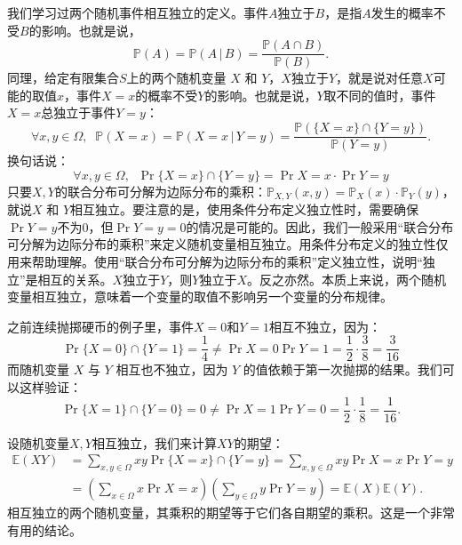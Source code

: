 \documentclass[12pt,UTF8]{ctexbook}
\begin{document}
我们学习过两个随机事件相互独立的定义。事件$A$独立于$B$，是指$A$发生的概率不受$B$的影响。也就是说，
$$\mathbb{P}(A) = \mathbb{P}(A \, | \, B) = \frac{\mathbb{P}(A \cap B)}{\mathbb{P}(B)}.$$
同理，给定有限集合$S$上的两个随机变量 \(X\) 和 \(Y\)，$X$独立于$Y$，就是说对任意$X$可能的取值$x$，事件$X=x$的概率不受$Y$的影响。也就是说，$Y$取不同的值时，事件$X=x$总独立于事件$Y=y$：
$$
\forall x,y \in \Omega,\;\;\mathbb{P}(X = x) = \mathbb{P}(X = x \, | \, Y = y) = \frac{\mathbb{P}(\{X = x\} \cap \{Y = y\})}{\mathbb{P}(Y = y)}.$$
换句话说：
\[
\forall x,y \in \Omega,\;\;
\Pr{\{X = x\}\cap\{Y = y\}} = \Pr{X = x} \cdot \Pr{Y = y}
\]
只要$X,Y$的联合分布可分解为边际分布的乘积：\(\mathbb{P}_{X,Y}(x,y) = \mathbb{P}_X(x) \cdot \mathbb{P}_Y(y)\)，就说\(X\) 和 \(Y\)相互独立。要注意的是，使用条件分布定义独立性时，需要确保$\Pr{Y=y}$不为$0$，但$\Pr{Y=y} = 0$的情况是可能的。因此，我们一般采用“联合分布可分解为边际分布的乘积”来定义随机变量相互独立。用条件分布定义的独立性仅用来帮助理解。使用“联合分布可分解为边际分布的乘积”定义独立性，说明“独立”是相互的关系。$X$独立于$Y$，则$Y$独立于$X$。反之亦然。本质上来说，两个随机变量相互独立，意味着一个变量的取值不影响另一个变量的分布规律。

\begin{ex}
之前连续抛掷硬币的例子里，事件$X=0$和$Y=1$相互不独立，因为：
\[
\Pr{\{X=0\}\cap\{Y=1\}} = \frac{1}{4} \neq \Pr{X=0}\Pr{Y=1} = \frac{1}{2} \cdot \frac{3}{8} = \frac{3}{16}
\]
而随机变量 \(X\) 与 \(Y\) 相互也不独立，因为 \(Y\) 的值依赖于第一次抛掷的结果。我们可以这样验证：
\[
\Pr{\{X=1\}\cap\{Y=0\}} = 0 \neq \Pr{X=1}\Pr{Y=0} = \frac{1}{2} \cdot \frac{1}{8} = \frac{1}{16}.
\]
\end{ex}

设随机变量$X,Y$相互独立，我们来计算$XY$的期望：
\begin{align*}
\mathbb{E}(XY) &= \sum_{x,y\in \Omega} xy \Pr{\{X=x\}\cap\{Y=y\}} = \sum_{x,y\in \Omega} xy \Pr{X=x} \Pr{Y=y} \\
&= \left(\sum_{x\in \Omega} x \Pr{X=x}\right) \left(\sum_{y\in \Omega} y \Pr{Y=y}\right) = \mathbb{E}(X) \mathbb{E}(Y).
\end{align*}
相互独立的两个随机变量，其乘积的期望等于它们各自期望的乘积。这是一个非常有用的结论。
\end{document}
